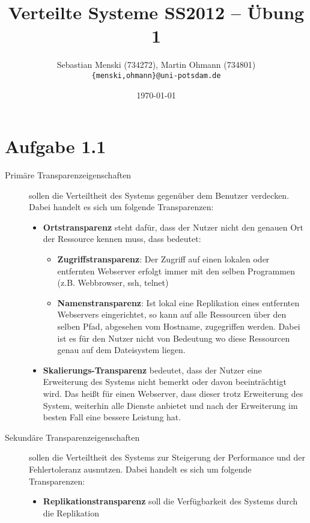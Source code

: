 \documentclass[german,12pt,a4paper]{article}
\begin{document}
\title{\textbf{Verteilte Systeme SS2012 -- Übung 1}}
\author{Sebastian Menski (734272), Martin Ohmann (734801) \\ \texttt{\{menski,ohmann\}@uni-potsdam.de}}
\date{\today}

\maketitle

\section*{Aufgabe 1.1}

\begin{description}
	\item[Primäre Transparenzeigenschaften] sollen die Verteiltheit des Systems gegenüber dem Benutzer
	verdecken. Dabei handelt es sich um folgende Transparenzen:
	\begin{itemize}
		\item \textbf{Ortstransparenz} steht dafür, dass der Nutzer nicht den genauen Ort der Ressource kennen
		muss, dass bedeutet:
		\begin{itemize}
			\item \textbf{Zugriffstransparenz}: Der Zugriff auf einen lokalen oder entfernten Webserver erfolgt
			immer mit den selben Programmen (z.B. Webbrowser, ssh, telnet)
			\item \textbf{Namenstransparenz}: Ist lokal eine Replikation eines entfernten Webservers eingerichtet,
			so kann auf alle Ressourcen über den selben Pfad, abgesehen vom Hostname, zugegriffen werden. Dabei
			ist es für den Nutzer nicht von Bedeutung wo diese Ressourcen genau auf dem Dateisystem liegen.
		\end{itemize}
		\item \textbf{Skalierungs-Transparenz} bedeutet, dass der Nutzer eine Erweiterung des Systems nicht
		bemerkt oder davon beeinträchtigt wird. Das heißt für einen Webserver, dass dieser trotz
		Erweiterung des System, weiterhin	alle Dienste anbietet und nach der Erweiterung im besten Fall
		eine bessere Leistung hat.
	\end{itemize}
	\item[Sekundäre Transparenzeigenschaften] sollen die Verteiltheit des Systems zur Steigerung der
	Performance und der Fehlertoleranz ausnutzen. Dabei handelt es sich um folgende Transparenzen:
	\begin{itemize}
		\item \textbf{Replikationstransparenz} soll die Verfügbarkeit des Systems durch die Replikation

\end{itemize}
\end{description}
\end{document}
